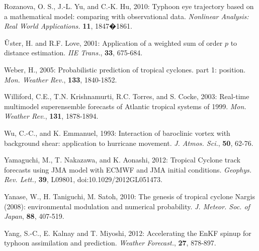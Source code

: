 \documentclass[a4paper, 12pt]{article}
\begin{document}
{\begin{list}{}{\leftmargin=1em \itemindent=-2em}
\item  Rozanova, O. S., J.-L. Yu, and C.-K. Hu, 2010: Typhoon eye trajectory based on a mathematical model: comparing
with observational data. \emph{Nonlinear Analysis: Real World Applications.} {\bf 11}, 1847�1861.

\item $\ddot{\textup{U}}$ster, H. and R.F. Love, 2001: Application of a weighted sum of order $p$ to distance estimation. \emph{IIE Trans.}, {\bf 33}, 675-684.

\item Weber, H., 2005: Probabilistic prediction of tropical cyclones. part 1: position. \emph{Mon. Weather Rev.}, {\bf 133}, 1840-1852.

\item Williford, C.E., T.N. Krishnamurti, R.C. Torres, and S. Cocke, 2003: Real-time multimodel superensemble forecasts of Atlantic tropical systems of 1999. \emph{Mon. Weather Rev.}, {\bf 131}, 1878-1894.

\item Wu, C.-C., and K. Emmanuel, 1993: Interaction of baroclinic vortex with background shear: application to hurricane movement. \emph{J. Atmos. Sci.}, {\bf 50}, 62-76.

    \item Yamaguchi, M., T. Nakazawa, and K. Aonashi, 2012:  Tropical Cyclone track forecasts using JMA model with ECMWF and JMA initial conditions. \emph{Geophys. Rev. Lett.,} {\bf 39}, L09801, doi:10.1029/2012GL051473.

\item Yanase, W., H. Taniguchi, M. Satoh, 2010: The genesis of tropical cyclone Nargis (2008): environmental modulation and numerical probability. \emph{J. Meteor. Soc. of Japan}, {\bf 88}, 407-519.

        \item Yang, S.-C., E. Kalnay and T. Miyoshi, 2012: Accelerating the EnKF spinup for typhoon assimilation and prediction. \emph{Weather Forecast.}, {\bf 27}, 878-897.



\end{list}

\newpage

}
\end{document}
